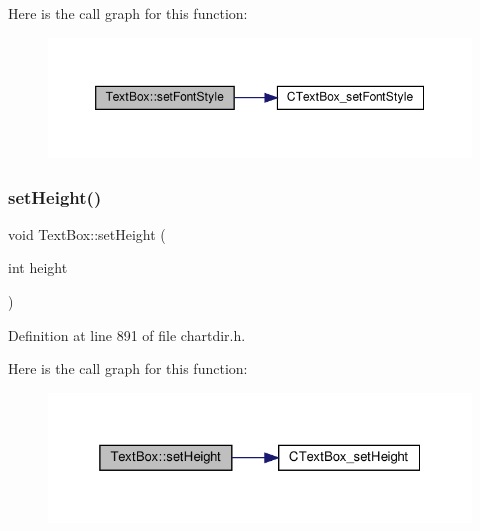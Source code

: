 Here is the call graph for this function\+:
\nopagebreak
\begin{figure}[H]
\begin{center}
\leavevmode
\includegraphics[width=350pt]{class_text_box_a5df18fab11787fa81049cd11dbfe4e8e_cgraph}
\end{center}
\end{figure}
\mbox{\label{class_text_box_afd0657609449e31181b5fa738d51189c}} 
\subsubsection{\texorpdfstring{set\+Height()}{setHeight()}}
{\footnotesize\ttfamily void Text\+Box\+::set\+Height (\begin{DoxyParamCaption}\item[{int}]{height }\end{DoxyParamCaption})\hspace{0.3cm}{\ttfamily [inline]}}



Definition at line 891 of file chartdir.\+h.

Here is the call graph for this function\+:
\nopagebreak
\begin{figure}[H]
\begin{center}
\leavevmode
\includegraphics[width=325pt]{class_text_box_afd0657609449e31181b5fa738d51189c_cgraph}
\end{center}
\end{figure}
\mbox{\label{class_text_box_aaadf6bbde148a221869df43c11a0d623}} 
